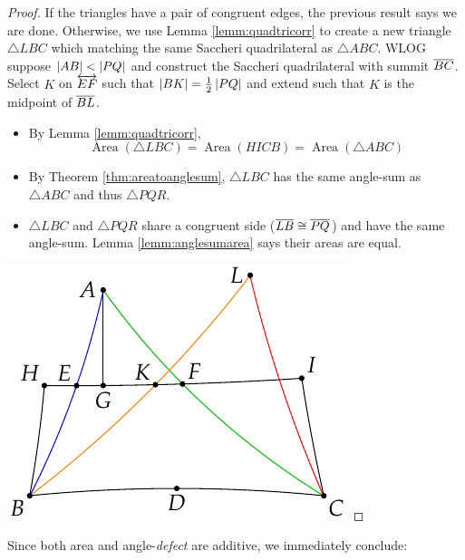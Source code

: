 \begin{proof}
	If the triangles have a pair of congruent edges, the previous result says we are done. Otherwise, we use Lemma \ref{lemm:quadtricorr} to create a new triangle $\triangle LBC$ which matching the same Saccheri quadrilateral as $\triangle ABC$.\smallbreak
	WLOG suppose $\left| AB\right|<\left| PQ\right|$ and construct the Saccheri quadrilateral with summit $\overline{BC}$. Select $K$ on $\overleftrightarrow{EF}$ such that $\left| BK\right|=\frac 12\left| PQ\right|$ and extend such that $K$ is the midpoint of $\overline{BL}$.\par
	\begin{minipage}[t]{0.6\linewidth}\vspace{0pt}
		\begin{itemize}
		  \item By Lemma \ref{lemm:quadtricorr},
		  \[\operatorname{Area}(\triangle LBC)=\operatorname{Area}(HICB)=\operatorname{Area}(\triangle ABC)\]
		  \item By Theorem \ref{thm:areatoanglesum}, $\triangle LBC$ has the same angle-sum as $\triangle ABC$ and thus $\triangle PQR$.
		  \item $\triangle LBC$ and $\triangle PQR$ share a congruent side ($\overline{LB}\cong\overline{PQ}$) and have the same angle-sum. Lemma \ref{lemm:anglesumarea} says their areas are equal.
		\end{itemize}
	\end{minipage}
	\hfill
	\begin{minipage}[t]{0.39\linewidth}\vspace{-12pt}
		\flushright\includegraphics{area-saccheri9}\qedhere
	\end{minipage}
\end{proof}

Since both area and angle-\emph{defect} are additive, we immediately conclude:

